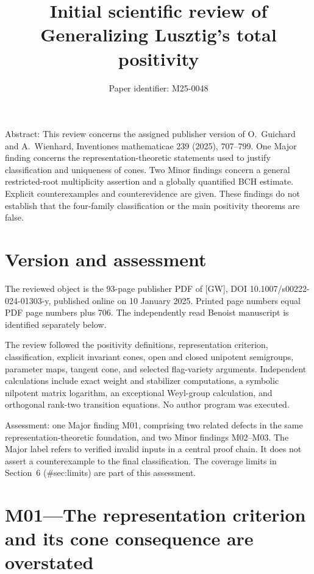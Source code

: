 \documentclass[10pt]{article}
\title{Initial scientific review of
Generalizing Lusztig’s total positivity}
\author{Paper identifier: M25-0048}
\date{}
\begin{document}
\maketitle
Abstract: This review concerns the assigned publisher version of O. Guichard and A. Wienhard, Inventiones mathematicae 239 (2025), 707–799. One Major finding concerns the representation-theoretic statements used to justify classification and uniqueness of cones. Two Minor findings concern a general restricted-root multiplicity assertion and a globally quantified BCH estimate. Explicit counterexamples and counterevidence are given. These findings do not establish that the four-family classification or the main positivity theorems are false.\par
\section*{Version and assessment}
The reviewed object is the 93-page publisher PDF of [GW], DOI 10.1007/s00222-024-01303-y, published online on 10 January 2025. Printed page numbers equal PDF page numbers plus 706. The independently read Benoist manuscript is identified separately below.\par
The review followed the positivity definitions, representation criterion, classification, explicit invariant cones, open and closed unipotent semigroups, parameter maps, tangent cone, and selected flag-variety arguments. Independent calculations include exact weight and stabilizer computations, a symbolic nilpotent matrix logarithm, an exceptional Weyl-group calculation, and orthogonal rank-two transition equations. No author program was executed.\par
Assessment: one Major finding M01, comprising two related defects in the same representation-theoretic foundation, and two Minor findings M02–M03. The Major label refers to verified invalid inputs in a central proof chain. It does not assert a counterexample to the final classification. The coverage limits in Section 6 (\#sec:limits) are part of this assessment.\par
\section*{M01—The representation criterion and its cone consequence are overstated}
\end{document}
